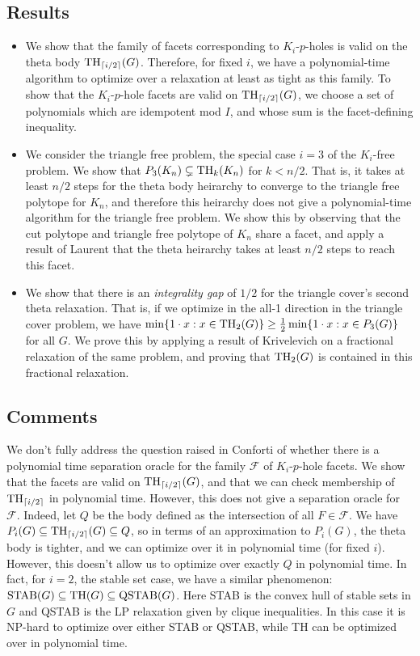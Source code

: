\subsection{Results}
\begin{itemize}
\item We show that the family of facets corresponding to $K_i$-$p$-holes is valid on the theta body $\textup{TH}_{\lceil i/2\rceil }(G)$.
Therefore, for fixed $i$, we have a polynomial-time algorithm to optimize over a relaxation at least as tight as this family. 
To show that the $K_i$-$p$-hole facets are valid on $\textup{TH}_{\lceil i/2\rceil}(G)$, we choose a set of  polynomials which are idempotent mod $I$, and whose sum is the facet-defining inequality.
\item We consider the triangle free problem, the special case $i=3$ of the $K_i$-free problem. We show that $P_3(K_n) \subsetneq \textup{TH}_{k}(K_n)$ for $k < n/2$.
That is, it takes at least $n/2$ steps for the theta body heirarchy to converge to the triangle free polytope for $K_n$, and therefore this heirarchy does not give a polynomial-time algorithm for the triangle free problem.
We show this by observing that the cut polytope and triangle free polytope of $K_n$ share a facet, and apply a result of Laurent \cite{moniquestuff} that the theta heirarchy takes at least $n/2$ steps to reach this facet.
\item We show that there is an {\em integrality gap} of $1/2$ for the triangle cover's second theta relaxation. 
That is, if we optimize in the all-1 direction in the triangle cover problem, we have $\min \{1 \cdot x: x \in \textup{TH}_2(G) \} \ge \frac{1}{2} \min \{1 \cdot x: x \in P_3(G)\}$ for all $G$. 
We prove this by applying a result of Krivelevich \cite{krivelevich} on a fractional relaxation of the same problem, and proving that $\textup{TH}_2(G)$ is contained in this fractional relaxation.
\end{itemize}
\subsection{Comments}
We don't fully address the question raised in Conforti of whether there is a polynomial time separation oracle for the family $\mathcal{F}$ of $K_i$-$p$-hole facets.
We show that the facets are valid on $\textup{TH}_{\lceil i/2\rceil}(G)$, and that we can check membership of $\textup{TH}_{\lceil i/2 \rceil}$ in polynomial time. 
However, this does not give a separation oracle for $\mathcal{F}$.
Indeed, let $Q$ be the body defined as the intersection of all $F \in \mathcal{F}$.
We have $P_i(G) \subseteq \textup{TH}_{\lceil i/2\rceil}(G) \subseteq Q$, so in terms of an approximation to $P_i(G)$, the theta body is tighter, and we can optimize over it in polynomial time (for fixed $i$).
However, this doesn't allow us to optimize over exactly $Q$ in polynomial time.
In fact, for $i=2$, the stable set case, we have a similar phenomenon: $\textup{STAB}(G) \subseteq \textup{TH}(G) \subseteq \textup{QSTAB}(G)$. 
Here STAB is the convex hull of stable sets in $G$ and QSTAB is the LP relaxation given by clique inequalities.
In this case it is NP-hard to optimize over either STAB or QSTAB, while TH can be optimized over in polynomial time.


